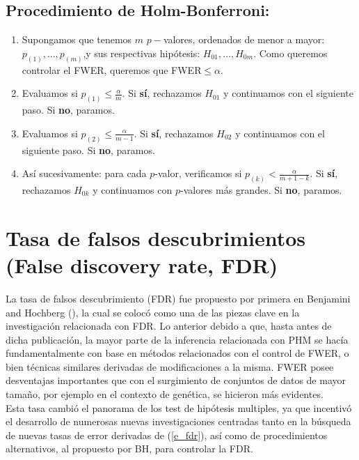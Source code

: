 \documentclass[11pt,letterpaper]{article}
\begin{document}
\subsection{Procedimiento de Holm-Bonferroni:} 
\begin{enumerate}[I]
	\item Supongamos que tenemos $m$ $p-$valores, ordenados de menor a mayor: $p_{(1)}, \ldots, p_{(m)}$,y sus respectivas hipótesis: $H_{01}, \ldots, H_{0m}$. Como queremos controlar el FWER, queremos que FWER$\leq\alpha$.
	\item Evaluamos si $p_{(1)}\leq \frac{\alpha}{m}$. Si \textbf{sí}, rechazamos $H_{01}$ y continuamos con el siguiente paso. Si \textbf{no}, paramos.
	\item Evaluamos si $p_{(2)}\leq \frac{\alpha}{m-1}$. Si \textbf{sí}, rechazamos $H_{02}$ y continuamos con el siguiente paso. Si \textbf{no}, paramos.
	\item Así sucesivamente: para cada $p$-valor, verificamos si $p_{(k)}<\frac{\alpha}{m+1-k}$.  Si \textbf{sí}, rechazamos $H_{0k}$ y continuamos con $p$-valores más grandes. Si \textbf{no}, paramos.
\end{enumerate}

\section{Tasa de falsos descubrimientos (False discovery rate, FDR) } \label{sec5}
La tasa de falsos descubrimiento (FDR) fue propuesto por primera en Benjamini and Hochberg (\cite{Benjamini1995}), la cual se colocó como una de las piezas clave en la investigación relacionada con FDR. Lo anterior debido a que, hasta antes de dicha publicación, la mayor parte de la inferencia relacionada con PHM se hacía fundamentalmente con base en métodos relacionados con el control de FWER, o bien técnicas similares derivadas de modificaciones a la misma. FWER posee desventajas importantes que con el surgimiento de conjuntos de datos de mayor tamaño, por ejemplo en el contexto de genética, se hicieron más evidentes. \\
Esta tasa cambió el panorama de los test de hipótesis multiples, ya que incentivó el desarrollo de numerosas nuevas investigaciones centradas tanto en la búsqueda de nuevas tasas de error derivadas de (\ref{e_fdr}), así como de procedimientos alternativos, al propuesto por BH, para controlar la FDR.\\
\end{document}

